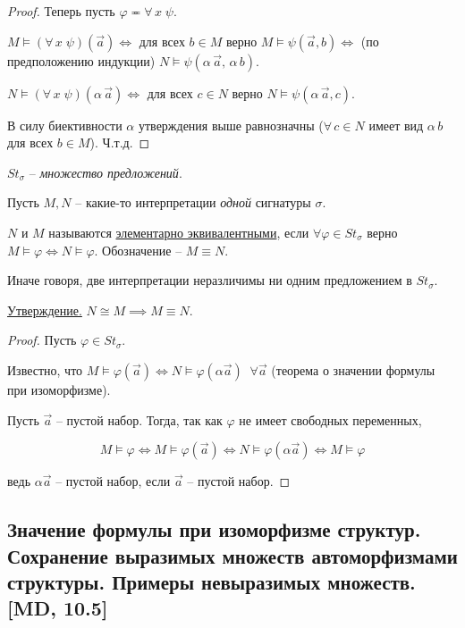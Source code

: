 \documentclass[a4paper, fleqn]{article}
\begin{document}
\begin{proof}
    Теперь пусть $\varphi \eqcirc \forall \, x \; \psi.$
    
    $M \vDash (\forall \, x \; \psi ) (\overset{\to}{a}) \iff $ для всех $b \in M$ верно $ M \vDash \psi (\overset{\to}{a}, b) \iff$ (по предположению индукции) $N \vDash \psi (\alpha \, \overset{\to}{a}, \, \alpha \, b).$
    
    $N \vDash (\forall \, x \; \psi ) (\alpha \, \overset{\to}{a}) \iff $ для всех $c \in N$ верно $ N \vDash \psi (\alpha \, \overset{\to}{a}, c).$
    
    В силу биективности $\alpha$ утверждения выше равнозначны ($\forall \, c \in N $ имеет вид $ \alpha \, b$ для всех $b \in M$). Ч.т.д.
    
    \end{proof}
    
    $St_\sigma$ -- \textit{множество предложений}.
    
    Пусть $M, N$ -- какие-то интерпретации \textit{одной} сигнатуры $\sigma. $
    
    $N$ и $M$ называются \underline{элементарно эквивалентными}, если $\forall \varphi \in St_\sigma$  верно $ M \vDash \varphi \iff  N \vDash \varphi.$  Обозначение -- $M \equiv N.$
    
    Иначе говоря, две интерпретации неразличимы ни одним предложением в $St_\sigma.$

    \underline{Утверждение.} $N \cong M \implies M \equiv N.$
    
    \begin{proof} Пусть $\varphi \in St_\sigma.$
    
    Известно, что $M \vDash \varphi (\overset{\to}{a}) \iff N \vDash \varphi (\alpha \overset{\to}{a})  \; \; \forall \overset{\to}{a}$ (теорема о значении формулы при изоморфизме).
    
    Пусть $\overset{\to}{a}$ -- пустой набор. Тогда, так как $\varphi$ не имеет свободных переменных,
    
    \[ M \vDash \varphi \iff   M \vDash \varphi (\overset{\to}{a}) \iff N \vDash \varphi (\alpha \overset{\to}{a}) \iff M \vDash \varphi\] 
    
    ведь $\alpha \overset{\to}{a}$ -- пустой набор, если $\overset{\to}{a}$ -- пустой набор.
    
    \end{proof}


    \subsection{Значение формулы при изоморфизме структур. Сохранение выразимых множеств автоморфизмами структуры. Примеры невыразимых множеств. [MD, 10.5]}
\end{document}
